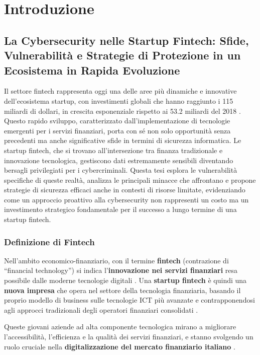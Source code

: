 \documentclass[a4paper,12pt]{report}
\begin{document}
\chapter{Introduzione}

\section{La Cybersecurity nelle Startup Fintech: Sfide, Vulnerabilità e Strategie di Protezione in un Ecosistema in Rapida Evoluzione}

Il settore fintech rappresenta oggi una delle aree più dinamiche e innovative dell'ecosistema startup, con investimenti globali che hanno raggiunto i 115 miliardi di dollari, in crescita esponenziale rispetto ai 53.2 miliardi del 2018 \cite{gartnerFintech}. Questo rapido sviluppo, caratterizzato dall'implementazione di tecnologie emergenti per i servizi finanziari, porta con sé non solo opportunità senza precedenti ma anche significative sfide in termini di sicurezza informatica. Le startup fintech, che si trovano all'intersezione tra finanza tradizionale e innovazione tecnologica, gestiscono dati estremamente sensibili diventando bersagli privilegiati per i cybercriminali. Questa tesi esplora le vulnerabilità specifiche di queste realtà, analizza le principali minacce che affrontano e propone strategie di sicurezza efficaci anche in contesti di risorse limitate, evidenziando come un approccio proattivo alla cybersecurity non rappresenti un costo ma un investimento strategico fondamentale per il successo a lungo termine di una startup fintech.
\subsection{Definizione di Fintech}

Nell'ambito economico-finanziario, con il termine \textbf{fintech} (contrazione di ``financial technology'') si indica l'\textbf{innovazione nei servizi finanziari} resa possibile dalle moderne tecnologie digitali \cite{tecnofinanza}. Una \textbf{startup fintech} è quindi una \textbf{nuova impresa} che opera nel settore della tecnologia finanziaria, basando il proprio modello di business sulle tecnologie ICT più avanzate e contrapponendosi agli approcci tradizionali degli operatori finanziari consolidati \cite{fintech_numeri}. 

Queste giovani aziende ad alta componente tecnologica mirano a migliorare l'accessibilità, l'efficienza e la qualità dei servizi finanziari, e stanno svolgendo un ruolo cruciale nella \textbf{digitalizzazione del mercato finanziario italiano} \cite{tecnofinanza}. 
\end{document}
